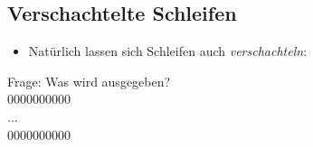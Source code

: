 \subsection{Verschachtelte Schleifen}
\begin{frame}
	\slidehead

	\begin{itemize}
		\item Natürlich lassen sich Schleifen auch \textit{verschachteln}:
		\vspace{0.1cm}
	\end{itemize}

	\begin{block}{Frage: Was wird ausgegeben?}
		\\
		0000000000\\
		...\\
		0000000000\\
	\end{block}
\end{frame}

\livecoding



